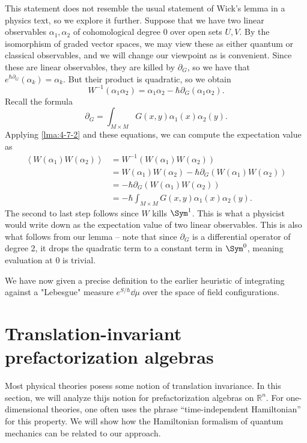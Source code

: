 This statement does not resemble the usual statement of Wick's lemma in a physics text, so we explore it further. Suppose that we have two linear observables $\alpha _1,\alpha _2$ of cohomological degree 0 over open sets $U,V$. By the isomorphism of graded vector spaces, we may view these as either quantum or classical observables, and we will change our viewpoint as is convenient. Since these are linear observables, they are killed by $\partial _G$, so we have that $e^{\hbar \partial _G}(\alpha _k)=\alpha _k$. But their product is quadratic, so we obtain
\[
	W^{-1} (\alpha_1\alpha _2) = \alpha _1\alpha _2 - \hbar \partial _G(\alpha _1\alpha _2)
.\]
Recall the formula
\[
	\partial _G = \int_{M\times M} G(x,y)\alpha _1(x)\alpha _2(y).
\]
Applying \cref{lma:4-7-2} and these equations, we can compute the expectation value as
\begin{align*}
	\left\langle W(\alpha_1)W(\alpha _2) \right\rangle &=W^{-1} (W(\alpha _1)W(\alpha _2))\\
							   &=W(\alpha_1)W(\alpha _2) - \hbar \partial _G(W(\alpha _1)W(\alpha _2))\\
							   &=-\hbar \partial _G(W(\alpha _1)W(\alpha _2))\\
							   &=-\hbar \int_{M\times M} G(x,y)\alpha _1(x)\alpha _2(y)
.\end{align*}
The second to last step follows since $W$ kills $\Sym ^1$. This is what a physicist would write down as the expectation value of two linear observables. This is also what follows from our lemma -- note that since $\partial _G$ is a differential operator of degree 2, it drops the quadratic term to a constant term in $\Sym ^0$, meaning evaluation at 0 is trivial.

We have now given a precise definition to the earlier heuristic of integrating against a "Lebesgue" measure $e^{S/\hbar } \dd \mu $ over the space of field configurations.

\section{Translation-invariant prefactorization algebras}

Most physical theories posess some notion of translation invariance. In this section, we will analyze thijs notion for prefactorization algebras on $\mathbb{R} ^n$. For one-dimensional theories, one often uses the phrase ``time-independent Hamiltonian'' for this property. We will show how the Hamiltonian formalism of quantum mechanics can be related to our approach.

